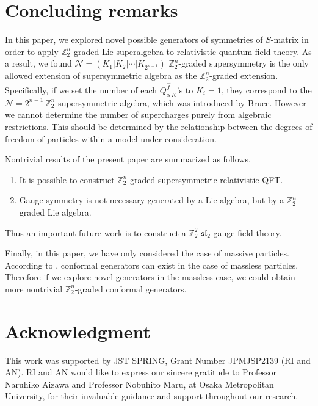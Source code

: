 \documentclass[a4paper,12pt]{article}
\def\Z{\mathbb{Z}}
\def\ua{\alpha}
\theoremstyle{plain}
\theoremstyle{definition}
\begin{document}
\section{Concluding remarks}
In this paper, we explored novel possible generators of symmetries of $S$-matrix in order to apply $\Z_2^n$-graded Lie superalgebra to relativistic quantum field theory. As a result, we found $\mathcal{N}=(K_1|K_2|\cdots |K_{2^{n-1}})$ $\Z_2^n$-graded supersymmetry is the only allowed extension of supersymmetric algebra as the $\Z_2^n$-graded extension. Specifically, if we set the number of each $Q_{\ua\, K}^{\vec{f}}$'s to $K_i=1$, they correspond to the $\mathcal{N}=2^{n-1}\ \Z_2^n$-supersymmetric algebra, which was introduced by Bruce\cite{Bruce}. However we cannot determine the number of supercharges purely from algebraic restrictions. This should be determined by the relationship between the degrees of freedom of particles within a model under consideration. 

Nontrivial results of the present paper are summarized as follows.
\begin{enumerate}
 \item It is possible to construct $\Z_2^n$-graded supersymmetric relativistic QFT.
 \item Gauge symmetry is not necessary generated by a Lie algebra, but by a $\Z_2^n$-graded Lie algebra.   
\end{enumerate} 
Thus an important future work is to construct a $\Z_2^2$-$\mathfrak{sl}_2$ gauge field theory.

Finally, in this paper, we have only considered the case of massive particles.
According to \cite{CM,HLS}, conformal generators can exist in the case of massless particles.
Therefore if we explore novel generators in the massless case, we could obtain more nontrivial $\Z_2^n$-graded conformal generators.  

\section*{Acknowledgment}
This work was supported by JST SPRING, Grant Number JPMJSP2139 (RI and AN). RI and AN would like to express our sincere gratitude to Professor Naruhiko Aizawa and Professor Nobuhito Maru, at Osaka Metropolitan University, for their invaluable guidance and support throughout our research.
\end{document}
